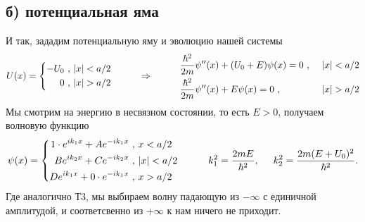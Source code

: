 \subsection*{б) потенциальная яма}
И так, зададим потенциальную яму и эволюцию нашей системы
\begin{equation*}
	U(x) = \left\{\begin{aligned}
		- U_0 \ , \ &|x| < a/2\\
		0\ , \ &|x|>a/2
	\end{aligned}\right.
	\hspace{1 cm}
	\Rightarrow
	\hspace{1 cm}
	\begin{aligned}
		&\frac{\hbar^2}{2m} \psi''(x) + (U_0 + E) \psi(x) = 0 \ , \ &|x| < a/2\\
		&\frac{\hbar^2}{2m} \psi''(x) + E \psi(x) = 0 \ , \ &|x|>a/2
	\end{aligned}
\end{equation*}
Мы смотрим на энергию в несвязном состоянии, то есть $E>0$, получаем волновую функцию
\begin{equation*}
	\psi(x) = \left\{\begin{aligned}
		1 \cdot e^{i k_1 x} + A e^{- i k_1 x}\ , \ & x<a/2 \\
		B e^{i k_2 x} + C e^{- i k_2 x} \ , \ & |x|<a/2 \\
		D e^{i k_1 x} + 0 \cdot e^{- i k_1 x}\ , \ & x > a/2
	\end{aligned}\right.
	\hspace{1 cm}
	k_1^2 = \frac{2 m E}{\hbar^2},
	\hspace{0.5 cm}
	k_2^2 = \frac{2 m (E + U_0)^2}{\hbar^2}.
\end{equation*}
Где аналогично Т3, мы выбираем волну падающую из $-\infty$ с единичной амплитудой, и соответсвенно из $+\infty$ к нам ничего не приходит.


